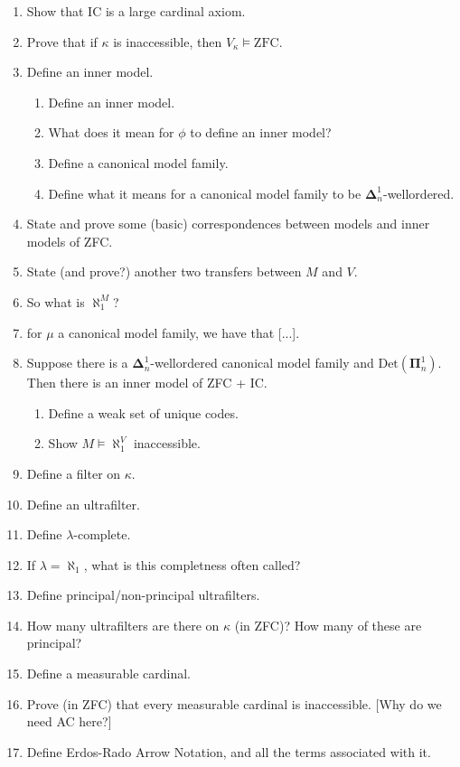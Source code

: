 \documentclass[]{article}
\newcommand{\bopi}{\bm{\Pi}}
\newcommand{\bodel}{\bm{\Delta}}
\newcommand{\Det}{\textrm{Det}}
\newcommand{\zfc}{\textrm{ZFC}}
\begin{document}
\begin{enumerate}
    \item Show that IC is a large cardinal axiom.
    \item Prove that if $\kappa$ is inaccessible, then $V_\kappa \models \zfc$.
    \item Define an inner model.
    \begin{enumerate}
        \item Define an inner model.
        \item What does it mean for $\phi$ to define an inner model?
        \item Define a canonical model family.
        \item Define what it means for a canonical model family to be $\bodel^1_n$-wellordered.
    \end{enumerate}
    \item State and prove some (basic) correspondences between models and inner models of ZFC.
    \item State (and prove?) another two transfers between $M$ and $V$.
    \item So what is $\aleph_1^M$?
    \item for $\mu$ a canonical model family, we have that [...].
    \item Suppose there is a $\bodel^1_n$-wellordered canonical model family and $\Det(\bopi^1_n)$. Then there is an inner model of ZFC + IC.
    \begin{enumerate}
        \item Define a weak set of unique codes.
        \item Show $M\models \aleph_1^V$ inaccessible.
    \end{enumerate}
    \item Define a filter on $\kappa$.
    \item Define an ultrafilter.
    \item Define $\lambda$-complete.
    \item If $\lambda = \aleph_1$, what is this completness often called?
    \item Define principal/non-principal ultrafilters.
    \item How many ultrafilters are there on $\kappa$ (in ZFC)? How many of these are principal?
    \item Define a measurable cardinal.
    \item Prove (in ZFC) that every measurable cardinal is inaccessible. [Why do we need AC here?]
    \item Define Erdos-Rado Arrow Notation, and all the terms associated with it.

\end{enumerate}
\end{document}
